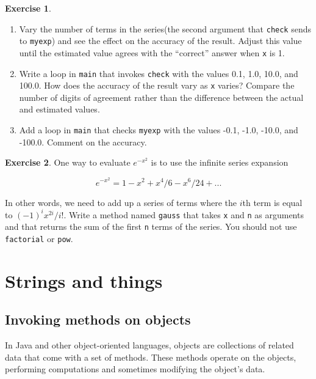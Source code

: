 \documentclass[12pt]{book}
\theoremstyle{definition}
\newtheorem{excz}{Exercise}[chapter]
\newenvironment{exercise}{\bigskip\begin{excz}\mbox{}}{\end{excz}}
\begin{document}
\begin{exercise}
\begin{enumerate}
\item Vary the number of terms in the series(the second argument
that {\tt check} sends to {\tt myexp}) and see the effect on
the accuracy of the result.  Adjust this value until the estimated
value agrees with the ``correct'' answer when {\tt x} is 1.

\item Write a loop in {\tt main} that invokes {\tt check} with the
values 0.1, 1.0, 10.0, and 100.0.  How does the accuracy of the
result vary as {\tt x} varies?  Compare the number of digits of
agreement rather than the difference between the actual and
estimated values.

\item Add a loop in {\tt main} that checks {\tt myexp} with the values
-0.1, -1.0, -10.0, and -100.0.  Comment on the accuracy.

\end{enumerate}
\end{exercise}


\begin{exercise}
One way to evaluate $e^{-x^2}$ is to use the infinite series expansion

\begin{equation}
e^{-x^2} = 1 - x^2 + x^4/6 - x^6/24 + ...
\end{equation}

In other words, we need to add up a series of terms where the $i$th
term is equal to $(-1)^i x^{2i} / i!$.  Write a method named {\tt gauss}
that takes {\tt x} and {\tt n} as arguments and that returns the sum
of the first {\tt n} terms of the series.  You should not use {\tt
factorial} or {\tt pow}.
\end{exercise}


\chapter{Strings and things}
\label{chap07}
\label{strings}

\section{Invoking methods on objects}

In Java and other object-oriented languages, objects are collections
of related data that come with a set of methods.  These methods
operate on the objects, performing computations and sometimes
modifying the object's data.
\end{document}
